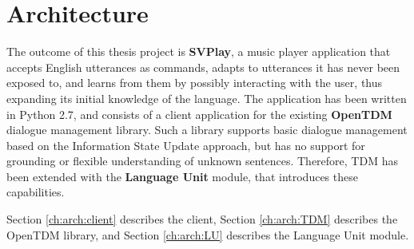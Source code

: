 
\chapter{Architecture} %

\label{ch:arch} %



The outcome of this thesis project is \textbf{SVPlay}, a music player application that accepts English utterances as commands, adapts to utterances it has never been exposed to, and learns from them by possibly interacting with the user, thus expanding its initial knowledge of the language. The application has been written in Python 2.7, and consists of a client application for the existing \textbf{OpenTDM} dialogue management library. Such a library supports basic dialogue management based on the Information State Update approach, but has no support for grounding or flexible understanding of unknown sentences. Therefore, TDM has been extended with the \textbf{Language Unit} module, that introduces these capabilities.

Section \ref{ch:arch:client} describes the \pname client, Section \ref{ch:arch:TDM} describes the OpenTDM library, and Section \ref{ch:arch:LU} describes the Language Unit module.



